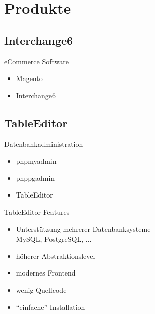 
\section{Produkte}


\subsection{Interchange6}
\begin{frame}{eCommerce Software}
\begin{itemize}
\item \sout{Magento}
\item Interchange6
\end{itemize}
\end{frame}

\subsection{TableEditor}
\begin{frame}{Datenbankadministration}
\begin{itemize}
\item \sout{phpmyadmin}
\item \sout{phppgadmin}
\item TableEditor
\end{itemize}
\end{frame}

\begin{frame}{TableEditor Features}
\begin{itemize}
\item Unterstützung mehrerer Datenbanksysteme \\
      MySQL, PostgreSQL, ...
\item höherer Abstraktionslevel
\item modernes Frontend
\item wenig Quellcode
\item ``einfache'' Installation
\end{itemize}
\end{frame}

